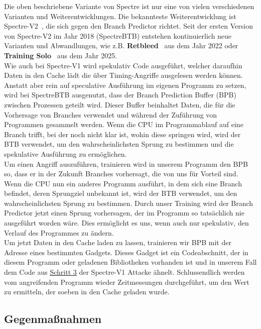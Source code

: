 Die oben beschriebene Variante von Spectre ist nur eine von vielen verschiedenen Varianten und Weiterentwicklungen.
Die bekannteste Weiterentwicklung ist Spectre-V2~\cite{spec_v2}, die sich gegen den Branch Predictor richtet.
Seit der ersten Version von Spectre-V2 im Jahr 2018 (SpectreBTB) entstehen kontinuierlich neue Varianten und Abwandlungen, wie z.B. \textbf{Retbleed}~\cite{spec_v2_retbleed} aus dem Jahr 2022 oder \textbf{Training Solo}~\cite{training_solo} aus dem Jahr 2025. \\
Wie auch bei Spectre-V1 wird spekulativ Code ausgeführt, welcher daraufhin Daten in den Cache lädt die über Timing-Angriffe ausgelesen werden können.
Anstatt aber rein auf speculative Ausführung im eigenen Programm zu setzen, wird bei SpectreBTB ausgenutzt, dass der Branch Prediction Buffer (BPB) zwischen Prozessen geteilt wird.
Dieser Buffer beinhaltet Daten, die für die Vorhersage von Branches verwendet und während der Zuführung von Programmen gesammelt werden.
Wenn die CPU im Programmablauf auf eine Branch trifft, bei der noch nicht klar ist, wohin diese springen wird, wird der BTB verwendet, um den wahrscheinlichsten Sprung zu bestimmen und die spekulative Ausführung zu ermöglichen. \\
Um einen Angriff auszuführen, trainieren wird in unserem Programm den BPB so, dass er in der Zukunft Branches vorhersagt, die von uns für Vorteil sind.
Wenn die CPU nun ein anderes Programm ausführt, in dem sich eine Branch befindet, deren Sprungziel unbekannt ist, wird der BTB verwendet, um den wahrscheinlichsten Sprung zu bestimmen.
Durch unser Training wird der Branch Predictor jetzt einen Sprung vorhersagen, der im Programm so tatsächlich nie ausgeführt worden wäre.
Dies ermöglicht es uns, wenn auch nur spekulativ, den Verlauf des Programmes zu ändern. \\
Um jetzt Daten in den Cache laden zu lassen, trainieren wir BPB mit der Adresse eines bestimmten Gadgets.
Dieses Gadget ist ein Codeabschnitt, der in diesem Programm oder geladenen Bibliotheken vorhanden ist und in unserem Fall dem Code aus \hyperref[itm:step3_code]{\underline{Schritt 3}} der Spectre-V1 Attacke ähnelt.
Schlussendlich werden vom angreifenden Programm wieder Zeitmessungen durchgeführt, um den Wert zu ermitteln, der soeben in den Cache geladen wurde.

\subsection{Gegenmaßnahmen}\label{subsec:gegenmassnahmen}

